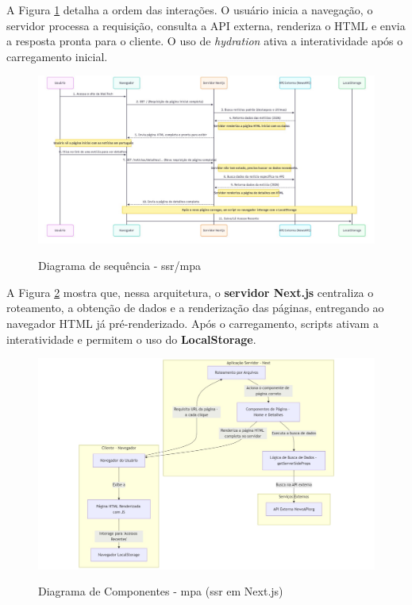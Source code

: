A Figura \ref{fig:sequence-diagram-ssr} detalha a ordem das interações. O usuário inicia a navegação, o servidor processa a requisição, consulta a API externa, renderiza o HTML e envia a resposta pronta para o cliente. O uso de \textit{hydration} ativa a interatividade após o carregamento inicial.

\begin{figure}[H]
  \centering
  \caption{Diagrama de sequência - \acrshort{ssr}/\acrshort{mpa}}
  \includegraphics[width=1\textwidth]{media/wall_tech_sequence_diagram.jpeg}
  \label{fig:sequence-diagram-ssr}
\end{figure}


A Figura \ref{fig:component-diagram-next} mostra que, nessa arquitetura, o \textbf{servidor Next.js} centraliza o roteamento, a obtenção de dados e a renderização das páginas, entregando ao navegador HTML já pré-renderizado. Após o carregamento, scripts ativam a interatividade e permitem o uso do \textbf{LocalStorage}.

\begin{figure}[H]
  \centering
  \caption{Diagrama de Componentes - \acrshort{mpa} (\acrshort{ssr} em Next.js)}
  \includegraphics[width=1\textwidth]{media/component-diagram-next.jpeg}
  \label{fig:component-diagram-next}
\end{figure}


